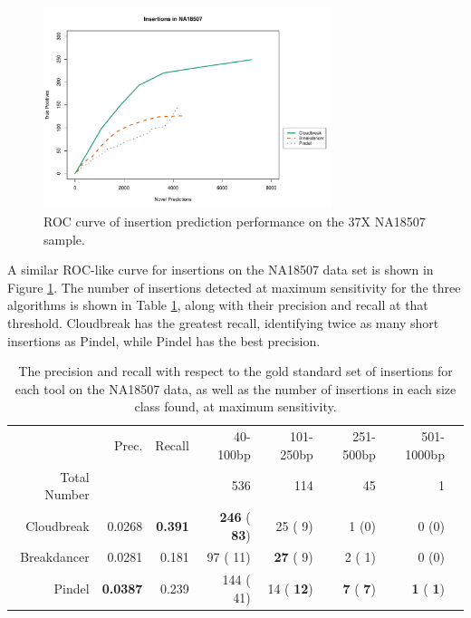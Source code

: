 \documentclass[11pt]{article}
\begin{document}
\begin{figure}
\centering
\includegraphics[width=0.75\textwidth]{../figures/NA18507_INS_ROC.pdf}
\caption{ROC curve of insertion prediction performance on the 37X NA18507 sample.}
\label{NA18507InsertionsRoc}
\end{figure}

A similar ROC-like curve for insertions on the NA18507 data set is shown in Figure \ref{NA18507InsertionsRoc}. The number of insertions detected at maximum sensitivity for the three algorithms is shown in Table \ref{NA18507InsertionPreds}, along with their precision and recall at that threshold. Cloudbreak has the greatest recall, identifying twice as many short insertions as Pindel, while Pindel has the best precision.

\begin{table}
\begin{center}
\begin{tabular}{rrr|rrrrr}
  \hline
 & Prec. & Recall & 40-100bp & 101-250bp & 251-500bp & 501-1000bp \\ 
Total Number & & & 536 & 114 & 45 & 1 \\
  \hline
Cloudbreak & 0.0268 & \textbf{0.391} & \textbf{246} (\textbf{ 83})  &  25 (  9) &    1 (0) & 0 (0) \\ 
Breakdancer & 0.0281 & 0.181 &  97 ( 11)  & \textbf{ 27} (  9) &    2 (  1) & 0 (0) \\  
  Pindel & \textbf{0.0387} & 0.239 & 144 ( 41)  &  14 (\textbf{ 12}) &  \textbf{  7} (\textbf{  7}) & \textbf{  1} (\textbf{  1})  \\ 
   \hline
\end{tabular}
\end{center}
\caption{The precision and recall with respect to the gold standard set of insertions for each tool on the NA18507 data, as well as the number of insertions in each size class found, at maximum sensitivity.}
\label{NA18507InsertionPreds}
\end{table}
\end{document}

